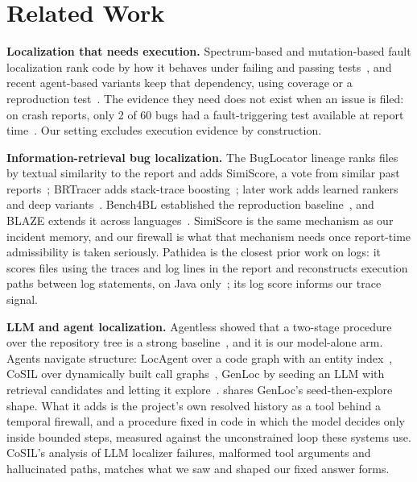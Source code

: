 \section{Related Work}
\label{sec:related}

\textbf{Localization that needs execution.} Spectrum-based and
mutation-based fault localization rank code by how it behaves under
failing and passing tests~\cite{wong2016survey}, and recent
agent-based variants keep that dependency, using coverage or a
reproduction test~\cite{rafi2024multiagent,yu2025orcaloca}. The
evidence they need does not exist when an issue is filed: on crash
reports, only 2 of 60 bugs had a fault-triggering test available at
report time~\cite{rafi2025sbest}. Our setting excludes execution
evidence by construction.

\textbf{Information-retrieval bug localization.} The BugLocator lineage
ranks files by textual similarity to the report and adds SimiScore, a
vote from similar past reports~\cite{zhou2012buglocator}; BRTracer adds
stack-trace boosting~\cite{wong2014brtracer}; later work adds learned
rankers~\cite{ye2014learning} and deep variants~\cite{niu2025deepirbl}.
Bench4BL established the reproduction baseline~\cite{lee2018bench4bl},
and BLAZE extends it across languages~\cite{chakraborty2025blaze}.
SimiScore is the same mechanism as our incident memory, and our
firewall is what that mechanism needs once report-time admissibility
is taken seriously. Pathidea is the closest prior work on logs: it
scores files using the traces and log lines in the report and
reconstructs execution paths between log statements, on Java
only~\cite{chen2022pathidea}; its log score informs our trace signal.

\textbf{LLM and agent localization.} Agentless showed that a two-stage
procedure over the repository tree is a strong
baseline~\cite{xia2025agentless}, and it is our model-alone arm. Agents
navigate structure: LocAgent over a code graph with an entity
index~\cite{chen2025locagent}, CoSIL over dynamically built call
graphs~\cite{jiang2025cosil}, GenLoc by seeding an LLM with retrieval
candidates and letting it explore~\cite{asad2026genloc}. \sys{} shares
GenLoc's seed-then-explore shape. What it adds is the project's own
resolved history as a tool behind a temporal firewall, and a procedure
fixed in code in which the model decides only inside bounded steps,
measured against the unconstrained loop these systems use. CoSIL's
analysis of LLM localizer failures, malformed tool arguments and
hallucinated paths, matches what we saw and shaped our fixed answer
forms.

